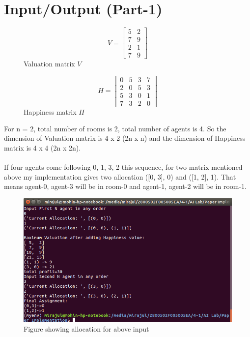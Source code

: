 \documentclass[12pt]{article}
\begin{document}
\section*{Input/Output (Part-1)}
\begin{figure}[H]
	\begin{minipage}{.5\linewidth}
		\centering
		\[V=\left[\begin{array}{cc}
		5 & 2 \\
		7 & 9 \\
		2 & 1 \\
		7 & 9
		\end{array}\right]\]
		Valuation matrix $V$
	\end{minipage}%
	\begin{minipage}{.5\linewidth}
		\centering
		\[H=\left[\begin{array}{cccc}
		0 & 5 & 3 & 7 \\
		2 & 0 & 5 & 3 \\
		5 & 3 & 0 & 1 \\
		7 & 3 & 2 & 0
		\end{array}\right]\]
		Happiness matrix $H$
	\end{minipage}
\end{figure}
\noindent
For n = 2, total number of rooms is 2, total number of agents is 4. So the dimension of Valuation matrix is 4 x 2 (2n x n) and the dimension of Happiness matrix is 4 x 4 (2n x 2n).\\\\
\noindent If four agents come following 0, 1, 3, 2 this sequence, for two matrix mentioned above my implementation gives two allocation ([0, 3], 0) and ([1, 2], 1). That means agent-0, agent-3 will be in room-0 and agent-1, agent-2 will be in room-1. 
\begin{figure}[H]
	\includegraphics[width=\textwidth, center]{1}
	\caption{Figure showing allocation for above input}
	\label{fig:figure2}
\end{figure}
\end{document}
